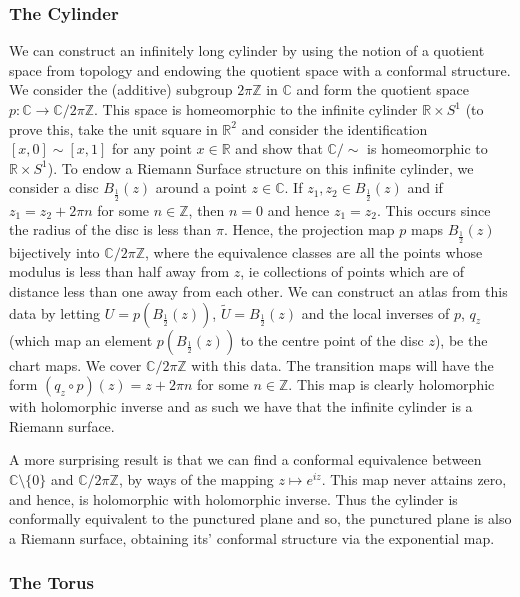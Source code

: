 \documentclass[11pt]{report}
\theoremstyle{definition}
\begin{document}
\subsubsection{The Cylinder}
We can construct an infinitely long cylinder by using the notion of a quotient space from topology and endowing the quotient space with a conformal structure. We consider the (additive) subgroup $2\pi \mathbb{Z}$ in $\mathbb{C}$ and form the quotient space $p \colon \mathbb{C} \rightarrow \mathbb{C}/2\pi \mathbb{Z}$. This space is homeomorphic to the infinite cylinder $\mathbb{R} \times S^1$ (to prove this, take the unit square in $\mathbb{R}^2$ and consider the identification $[x,0] \sim [x,1]$ for any point $x \in \mathbb{R}$ and show that $\mathbb{C}/\sim$ is homeomorphic to $\mathbb{R}\times S^1$). To endow a Riemann Surface structure on this infinite cylinder, we consider a disc $B_{\frac{1}{2}}(z)$ around a point $z \in \mathbb{C}$. If $z_1, z_2 \in B_{\frac{1}{2}}(z)$ and if $z_1 = z_2 + 2\pi n$ for some $n \in \mathbb{Z}$, then $n=0$ and hence $z_1=z_2$. This occurs since the radius of the disc is less than $\pi$. Hence, the projection map $p$ maps $B_{\frac{1}{2}}(z)$ bijectively into $\mathbb{C}/2\pi\mathbb{Z}$, where the equivalence classes are all the points whose modulus is less than half away from $z$, ie collections of points which are of distance less than one away from each other. We can construct an atlas from this data by letting $U = p(B_{\frac{1}{2}}(z))$, $\tilde{U} = B_{\frac{1}{2}}(z)$ and the local inverses of $p$, $q_z$ (which map an element $p(B_{\frac{1}{2}}(z))$ to the centre point of the disc $z$), be the chart maps. We cover $\mathbb{C}/2\pi\mathbb{Z}$ with this data. The transition maps will have the form $(q_z \circ p)(z) = z + 2\pi n$ for some $n \in \mathbb{Z}$. This map is clearly holomorphic with holomorphic inverse and as such we have that the infinite cylinder is a Riemann surface. 

A more surprising result is that we can find a conformal equivalence between $\mathbb{C}\setminus \{0\}$ and $\mathbb{C}/2\pi\mathbb{Z}$, by ways of the mapping $z \mapsto e^{iz}$. This map never attains zero, and hence, is holomorphic with holomorphic inverse. Thus the cylinder is conformally equivalent to the punctured plane and so, the punctured plane is also a Riemann surface, obtaining its' conformal structure via the exponential map. 
 
\subsubsection{The Torus}
\end{document}
